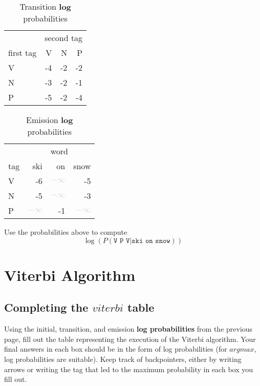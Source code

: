 \documentclass{article}
\newcommand{\inftygrey}{\textcolor{lightgray}{$-\infty$}}
\begin{document}
\begin{minipage}{0.5\textwidth}
\begin{table}[H]
    \centering
    \begin{tabular}{l|rrr}
         & \multicolumn{3}{c}{second tag}\\
         first tag &  V& N & P\\ \hline 
         V& -4 & -2 & -2 \\
         N& -3 & -2 & -1 \\
         P& -5 & -2 & -4\\
    \end{tabular}
    \caption{Transition \textbf{log} probabilities}
\end{table}
\end{minipage}
\begin{minipage}{0.5\textwidth}
\begin{table}[H]
    \centering
    \begin{tabular}{l|rrr} 
         & \multicolumn{3}{c}{word}\\
         tag &  ski&  on& snow\\ \hline 
         V&  -6 & \inftygrey & -5 \\
         N&  -5 & \inftygrey & -3\\ 
         P& \inftygrey & -1 & \inftygrey \\
    \end{tabular}
    \caption{Emission \textbf{log} probabilities}
\end{table}
\end{minipage}

\vspace{.25in}

\noindent Use the probabilities above to compute $$\log(P(\texttt{V P V}|\texttt{ski on snow}))$$

\newpage

\section{Viterbi Algorithm}
\subsection{Completing the $viterbi$ table}
Using the initial, transition, and emission \textbf{log probabilities} from the previous page, fill out the table representing the execution of the Viterbi algorithm. Your final answers in each box should be in the form of log probabilities (for $argmax$, log probabilities are suitable). Keep track of backpointers, either by writing arrows or writing the tag that led to the maximum probability in each box you fill out.
\end{document}
